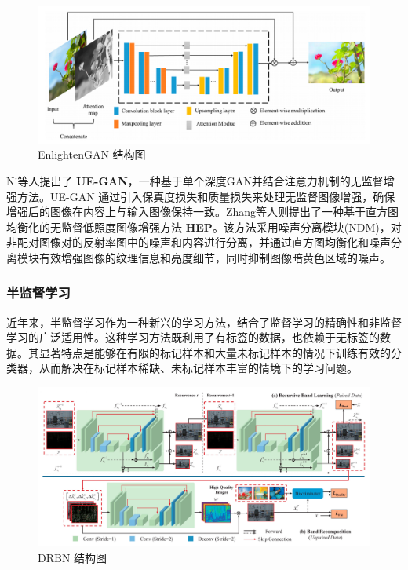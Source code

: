 \documentclass[a4paper]{ctexart}
\begin{document}
	\begin{figure}[htb]
		\centering 
		\includegraphics[width=0.7\columnwidth]{picture/LLIE/EnlightenGAN/EnlightenGAN}
		\caption{
			\label{fig: EnlightenGAN} 
			EnlightenGAN 结构图
		}
	\end{figure}
	
	Ni等人\cite{ni2020towards}提出了 \textbf{UE-GAN}，一种基于单个深度GAN并结合注意力机制的无监督增强方法。UE-GAN 通过引入保真度损失和质量损失来处理无监督图像增强，确保增强后的图像在内容上与输入图像保持一致。Zhang等人\cite{zhang2021unsupervised}则提出了一种基于直方图均衡化的无监督低照度图像增强方法 \textbf{HEP}。该方法采用噪声分离模块(NDM)，对非配对图像对的反射率图中的噪声和内容进行分离，并通过直方图均衡化和噪声分离模块有效增强图像的纹理信息和亮度细节，同时抑制图像暗黄色区域的噪声。
	
	\subsubsection{半监督学习}
	
	近年来，半监督学习作为一种新兴的学习方法，结合了监督学习的精确性和非监督学习的广泛适用性。这种学习方法既利用了有标签的数据，也依赖于无标签的数据。其显著特点是能够在有限的标记样本和大量未标记样本的情况下训练有效的分类器，从而解决在标记样本稀缺、未标记样本丰富的情境下的学习问题。
	
	\begin{figure}[htb]
		\centering 
		\includegraphics[width=0.7\columnwidth]{picture/LLIE/DRBN/DRBN}
		\caption{
			\label{fig: DRBN} 
			DRBN 结构图
		}
	\end{figure}
	
\end{document}
